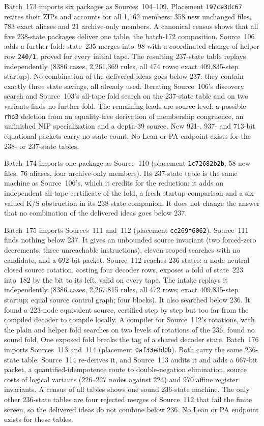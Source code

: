 \documentclass[11pt]{article}
\begin{document}
{Batch~173 imports six packages as Sources~104--109. Placement
\texttt{197ce3dc67} retires their ZIPs and accounts for all 1,162 members: 358
new unchanged files, 783 exact aliases and 21 archive-only members. A canonical
census shows that all five 238-state packages deliver one table, the batch-172
composition. Source~106 adds a further fold: state~235 merges into~98 with a
coordinated change of helper row \texttt{240/1}, proved for every initial tape.
The resulting 237-state table replays independently (8386 cases, 2,261,369
rules, all 474 rows; exact 409,835-step startup). No combination of the
delivered ideas goes below 237: they contain exactly three state savings, all
already used. Iterating Source~106's discovery search and Source~103's all-tape
fold search on the 237-state table and on two variants finds no further fold.
The remaining leads are source-level: a possible \texttt{rho3} deletion from an
equality-free derivation of membership congruence, an unfinished NIP
specialization and a depth-39 source. New 921-, 937- and 713-bit equational
packets carry no state count. No Lean or PA endpoint exists for the 238- or
237-state tables.

Batch~174 imports one package as Source~110 (placement \texttt{1c72682b2b}; 58
new files, 76 aliases, four archive-only members). Its 237-state table is the
same machine as Source~106's, which it credits for the reduction; it adds an
independent all-tape certificate of the fold, a fresh startup comparison and a
six-valued K/S obstruction in its 238-state companion. It does not change the
answer that no combination of the delivered ideas goes below 237.

Batch~175 imports Sources~111 and~112 (placement \texttt{cc269f6062}). Source~111
finds nothing below 237. It gives an unbounded source invariant (two forced-zero
decrements, three unreachable instructions), eleven scoped searches with no
candidate, and a 692-bit packet. Source~112 reaches 236 states: a node-neutral
closed source rotation, costing four decoder rows, exposes a fold of state~223
into~182 by the bit to its left, valid on every tape. The intake replays it
independently (8386 cases, 2,267,815 rules, all 472 rows; exact 409,835-step
startup; equal source control graph; four blocks). It also searched below 236.
It found a 223-node equivalent source, certified step by step but too far from
the compiled decoder to compile locally. A compiler for Source~112's rotations,
with the plain and helper fold searches on two levels of rotations of the 236,
found no sound fold. One exposed fold breaks the tag of a shared decoder state.
Batch~176 imports Sources~113 and~114 (placement \texttt{0af33e8d0b}). Both
carry the same 236-state table: Source~114 re-derives it, and Source~113 audits it
and adds a 667-bit packet, a quantified-idempotence route to double-negation
elimination, source costs of logical variants (226--227 nodes against 224) and
970 affine register invariants. A census of all tables shows one sound 236-state
machine. The only other 236-state tables are four rejected merges of Source~112
that fail the finite screen, so the delivered ideas do not combine below 236. No
Lean or PA endpoint exists for these tables.

}
\end{document}
